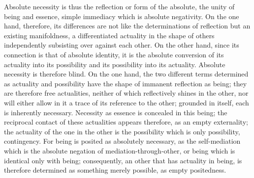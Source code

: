 Absolute necessity is thus
the reflection or form of the absolute,
the unity of being and essence,
simple immediacy which is absolute negativity.
On the one hand, therefore, its differences are
not like the determinations of reflection
but an existing manifoldness,
a differentiated actuality in the shape of others
independently subsisting over against each other.
On the other hand, since its connection is
that of absolute identity,
it is the absolute conversion of
its actuality into its possibility
and its possibility into its actuality.
Absolute necessity is therefore blind.
On the one hand, the two different terms
determined as actuality and possibility have
the shape of immanent reflection as being;
they are therefore free actualities,
neither of which reflectively shines in the other,
nor will either allow in it
a trace of its reference to the other;
grounded in itself, each is inherently necessary.
Necessity as essence is concealed in this being;
the reciprocal contact of these actualities appears
therefore, as an empty externality;
the actuality of the one in the other is
the possibility which is only possibility, contingency.
For being is posited as absolutely necessary,
as the self-mediation which is
the absolute negation of mediation-through-other,
or being which is identical only with being;
consequently, an other that has actuality in being,
is therefore determined as something merely possible,
as empty positedness.

